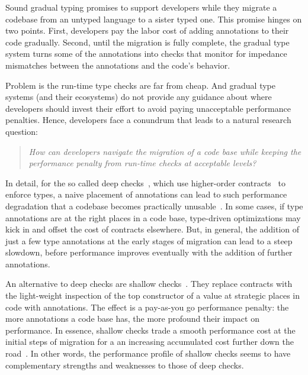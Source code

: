  Sound gradual typing promises to support developers while they migrate a
 codebase from an untyped language to a sister typed one.  This promise
 hinges on two points. First, developers pay the labor cost of 
 adding annotations to their code  gradually.  Second, until the
 migration is fully complete, the gradual type system turns some of the
 annotations into checks that monitor for impedance mismatches between the
 annotations and the code's behavior.

 Problem is the run-time type checks are far from cheap.  And gradual type
 systems (and their ecosystems) do not provide any guidance about where
 developers should invest their effort to avoid paying unacceptable
 performance penalties. Hence, developers face a
 conundrum that leads to a natural research question:
 \begin{quote}
 \em How can developers navigate the migration of a code base while keeping
 the performance penalty from run-time checks at acceptable
 levels?\end{quote}  


 In detail, for the so called deep
 checks~\cite{tf-dls-2006,tf-popl-2008,st-sfp-2006}, which use
 higher-order contracts~\cite{ff-icfp-2002} to enforce types, a naive
 placement of annotations can lead to such performance degradation that a
 codebase becomes practically
 unusable~\cite{tfgnvf-popl-2016,gtnffvf-jfp-2019}.  In some cases, if
 type annotations are at the right places in a code base, type-driven
 optimizations may kick in and offset the cost of  contracts elsewhere.  
 But, in general, the addition of just a few type annotations
 at the early stages of migration can lead to a steep slowdown,
 before performance improves eventually with the addition of further
 annotations. 

 An alternative to deep checks are shallow
 checks~\cite{vss-popl-2017,vksb-dls-2014,v-thesis-2019}. They replace
 contracts with the light-weight inspection of the top constructor of a
 value at strategic places in code with annotations.  The effect is a
 pay-as-you go performance penalty: the more annotations a code base has,
 the more profound their impact on performance. In essence, shallow checks
 trade a smooth performance cost at the initial steps of migration for a
 an increasing accumulated cost further down the
 road~\cite{gm-pepm-2018,rmhn-ecoop-2019}.  In other words, the
 performance profile of shallow checks seems to have complementary
 strengths and weaknesses to those of deep checks.  

